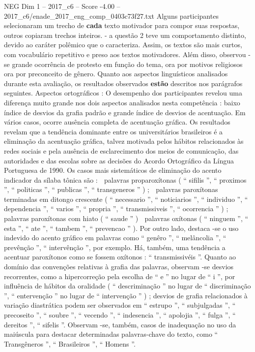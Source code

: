 \begin{textsample}{NEG Dim 1 – 2017\_c6 – Score -4.00 – 2017\_c6/enade\_2017\_eng\_comp\_0403c73f27.txt}
Alguns participantes selecionaram um trecho de \textbf{cada} texto motivador para compor suas respostas, outros copiaram trechos inteiros. - a questão 2 teve um comportamento distinto, devido ao caráter polêmico que o caracteriza.
Assim, os textos são mais curtos, com vocabulário repetitivo e preso aos textos motivadores.
Além disso, observou -se grande ocorrência de protesto em função do tema, ora por motivos religiosos ora por preconceito de gênero.
Quanto aos aspectos linguísticos analisados durante esta avaliação, os resultados observados \textbf{estão} descritos nos parágrafos seguintes.
Aspectos ortográficos : O desempenho dos participantes revelou uma diferença muito grande nos dois aspectos analisados nesta competência : baixo índice de desvios da grafia padrão e grande índice de desvios de acentuação.
Em vários casos, ocorre ausência completa de acentuação gráfica.
Os resultados revelam que a tendência dominante entre os universitários brasileiros é a eliminação da acentuação gráfica, talvez motivada pelos hábitos relacionados às redes sociais e pela ausência de esclarecimento dos meios de comunicação, das autoridades e das escolas sobre as decisões do Acordo Ortográfico da Língua Portuguesa de 1990.
Os casos mais sistemáticos de eliminação do acento indicador da sílaba tônica são :  palavras proparoxítonas ( “ sifilis ”, “ proximos ”, “ politicas ”, “ publicas ”, “ transgeneros ” ) ;  palavras paroxítonas terminadas em ditongo crescente ( “ necessario ”, “ noticiarios ”, “ individuo ”, “ dependencia ”, “ varios ”, “ propria ”, “ transmissiveis ”, “ ocorrencia ” ) ;  palavras paroxítonas com hiato ( “ saude ” )  palavras oxítonas ( “ ninguem ”, “ esta ”, “ ate ”, “ tambem ”, “ prevencao ” ).
Por outro lado, destaca -se o uso indevido do acento gráfico em palavras como “ genêro ”, “ melâncolia ”, “ prevênção ”, “ intervênção ”, por exemplo.
Há, também, uma tendência a acentuar paroxítonos como se fossem oxítonos : “ transmissivéis ”.
Quanto ao domínio das convenções relativas à grafia das palavras, observam -se desvios recorrentes, como a hipercorreção pela escolha de “ e ” no lugar de “ i ”, por influência de hábitos da oralidade ( “ descriminação ” no lugar de “ discriminação ”, “ entervenção ” no lugar de “ intervenção ” ) ; desvios de grafia relacionados à variação diastrática podem ser observados em “ estrupo ”, “ subjulgadas ”, “ precoseito ”, “ soubre ”, “ vecendo ”, “ indesencia ”, “ apolojia ”, “ fulga ”, “ dereitos ”, “ sifelis ”.
Observam -se, também, casos de inadequação no uso da maiúscula para destacar determinadas palavras-chave do texto, como “ Transgêneros ”, “ Brasileiros ”, “ Homens ”.

\end{textsample}
